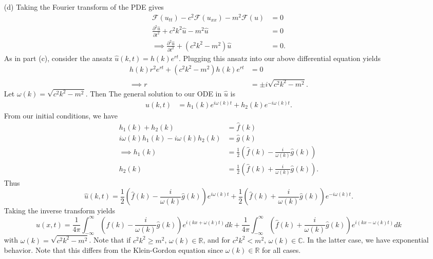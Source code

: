 \documentclass{article}
\begin{document}
\begin{itemize}
\begin{itemize}
        \item[(d)] Taking the Fourier transform of the PDE gives
        \begin{align*}
            \mathcal{F}(u_{tt}) - c^2\mathcal{F}(u_{xx}) - m^2\mathcal{F}(u) &= 0\\
            \frac{\partial^2\hat{u}}{\partial t^2} + c^2k^2\hat{u} - m^2\hat{u} &= 0\\
            \implies\frac{\partial^2\hat{u}}{\partial t^2} + (c^2k^2 - m^2)\hat{u} &= 0.
        \end{align*}
        As in part (c), consider the ansatz $\hat{u}(k,t) = h(k)e^{rt}$. Plugging this ansatz into our above differential equation yields
        \begin{align*}
            h(k)r^2e^{rt} + (c^2k^2 - m^2)h(k)e^{rt} &= 0\\
            \implies r &= \pm i\sqrt{c^2k^2 - m^2}.
        \end{align*}
        Let $\omega(k) = \sqrt{c^2k^2 - m^2}$. Then The general solution to our ODE in $\hat{u}$ is 
        \begin{align*}
            \hat{u}(k,t) &= h_1(k)e^{i\omega(k) t} + h_2(k) e^{-i\omega(k) t}.
        \end{align*}
        From our initial conditions, we have
        \begin{align*}
            h_1(k) + h_2(k) &= \hat{f}(k)\\
            i\omega(k)h_1(k) - i\omega(k)h_2(k) &= \hat{g}(k)\\
            \implies h_1(k) &= \frac{1}{2}\left(\hat{f}(k) - \frac{i}{\omega(k)}\hat{g}(k)\right)\\
            h_2(k) &= \frac{1}{2}\left(\hat{f}(k) + \frac{i}{\omega(k)}\hat{g}(k)\right).
        \end{align*}
        Thus
        \[\hat{u}(k,t) = \frac{1}{2}\left(\hat{f}(k) - \frac{i}{\omega(k)}\hat{g}(k)\right)e^{i\omega(k)t} + \frac{1}{2}\left(\hat{f}(k) + \frac{i}{\omega(k)}\hat{g}(k)\right)e^{-i\omega(k) t}.\]
        Taking the inverse transform yields
        \[u(x,t) = \frac{1}{4\pi}\int_{-\infty}^{\infty} \left(\hat{f}(k) - \frac{i}{\omega(k)}\hat{g}(k)\right)e^{i(kx + \omega(k) t)}dk + \frac{1}{4\pi}\int_{-\infty}^{\infty}\left(\hat{f}(k) + \frac{i}{\omega(k)}\hat{g}(k)\right)e^{i(kx - \omega(k) t)}dk\]
        with $\omega(k) = \sqrt{c^2k^2 - m^2}$. Note that if $c^2k^2 \geq  m^2$, $\omega(k) \in \mathbb{R}$, and for $c^2k^2 < m^2$, $\omega(k) \in \mathbb{C}$. In the latter case, we have exponential behavior. Note that this differs from the Klein-Gordon equation since $\omega(k) \in \mathbb{R}$ for all cases.
    \end{itemize}
\end{itemize}
\end{document}
